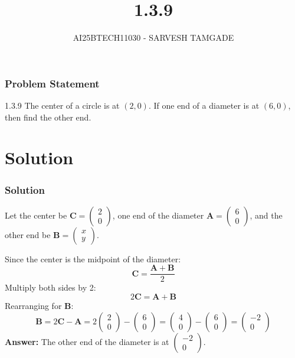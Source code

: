 \documentclass{beamer}
\title{1.3.9}
\author{AI25BTECH11030 - SARVESH TAMGADE}
\theoremstyle{remark}
\newcommand{\myvec}[1]{\ensuremath{\begin{pmatrix}#1\end{pmatrix}}}
\numberwithin{equation}{section}
\numberwithin{equation}{section}
\begin{document}
\begin{frame}
    \titlepage
\end{frame}

\begin{frame}
    \frametitle{Problem Statement}
    1.3.9 The center of a circle is at $(2,0)$. If one end of a diameter is at $(6,0)$, then find the other end.
\end{frame}

\section{Solution}
\begin{frame}
    \frametitle{Solution}
    Let the center be $\mathbf{C} = \myvec{2 \\ 0}$, one end of the diameter $\mathbf{A} = \myvec{6 \\ 0}$, and the other end be $\mathbf{B} = \myvec{x \\ y}$.
    \vspace{1em}
    
    Since the center is the midpoint of the diameter:
    \[
    \mathbf{C} = \frac{\mathbf{A} + \mathbf{B}}{2}
    \]
    Multiply both sides by 2:
    \[
    2\mathbf{C} = \mathbf{A} + \mathbf{B}
    \]
    Rearranging for $\mathbf{B}$:
    \[
    \mathbf{B} = 2\mathbf{C} - \mathbf{A} = 2\myvec{2 \\ 0} - \myvec{6 \\ 0} = \myvec{4 \\ 0} - \myvec{6 \\ 0} = \myvec{-2 \\ 0}
    \]
    \textbf{Answer:} The other end of the diameter is at $\myvec{-2 \\ 0}$.
\end{frame}
\end{document}
